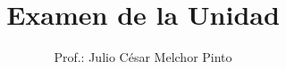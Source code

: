 \documentclass[12pt,addpoints]{evalua}
\title{Examen de la Unidad}
\author{Prof.: Julio César Melchor Pinto}
\begin{document}
{\small
\begin{multicols}{2}
    
    
    
    
    
\end{multicols}
% 
% 
}
\begin{questions}
    \begin{multicols}{2}
        \question[20] 
    \end{multicols}
    \begin{multicols}{2}
        \question[20] 
    \end{multicols}
    \newpage
    \question[20] 
    \question[20]  
    \newpage
    \question[20] 
    \newpage
    \question[20] 
\end{questions}
\end{document}
